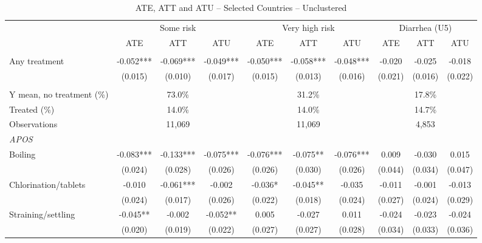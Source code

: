 \documentclass[10pt]{article}
\begin{document}
\clearpage
\begin{table}[H]
\centering
\caption{ATE, ATT and ATU -- Selected Countries -- Unclustered}
\label{tab:ate-att-atu-selected-countries-iid-aggregated}
\scriptsize
\setlength{\tabcolsep}{4pt}
\renewcommand{\arraystretch}{0.92}
\begin{adjustbox}{max width=\linewidth}
\begin{tabular}{lccccccccc}
\hline\hline
 & \multicolumn{3}{c}{Some risk} & \multicolumn{3}{c}{Very high risk} & \multicolumn{3}{c}{Diarrhea (U5)} \\
\cmidrule(lr){2-4}\cmidrule(lr){5-7}\cmidrule(lr){8-10}
 & ATE & ATT & ATU & ATE & ATT & ATU & ATE & ATT & ATU \\
\addlinespace[3pt]
\multicolumn{10}{l}{\textit{IRM}} \\
Any treatment & -0.052*** & -0.069*** & -0.049*** & -0.050*** & -0.058*** & -0.048*** & -0.020 & -0.025 & -0.018 \\
 & (0.015) & (0.010) & (0.017) & (0.015) & (0.013) & (0.016) & (0.021) & (0.016) & (0.022) \\
\addlinespace[6pt]
\multicolumn{10}{l}{\textit{Descriptive statistics and sample}} \\
Y mean, no treatment (\%) & \multicolumn{3}{c}{73.0\%} & \multicolumn{3}{c}{31.2\%} & \multicolumn{3}{c}{17.8\%} \\
Treated (\%) & \multicolumn{3}{c}{14.0\%} & \multicolumn{3}{c}{14.0\%} & \multicolumn{3}{c}{14.7\%} \\
Observations & \multicolumn{3}{c}{11,069} & \multicolumn{3}{c}{11,069} & \multicolumn{3}{c}{4,853} \\
\midrule
\multicolumn{10}{l}{\textit{APOS}} \\
Boiling & -0.083*** & -0.133*** & -0.075*** & -0.076*** & -0.075** & -0.076*** & 0.009 & -0.030 & 0.015 \\
 & (0.024) & (0.028) & (0.026) & (0.026) & (0.030) & (0.026) & (0.044) & (0.034) & (0.047) \\
Chlorination/tablets & -0.010 & -0.061*** & -0.002 & -0.036* & -0.045** & -0.035 & -0.011 & -0.001 & -0.013 \\
 & (0.024) & (0.017) & (0.026) & (0.022) & (0.018) & (0.024) & (0.027) & (0.024) & (0.029) \\
Straining/settling & -0.045** & -0.002 & -0.052** & 0.005 & -0.027 & 0.011 & -0.024 & -0.023 & -0.024 \\
 & (0.020) & (0.019) & (0.022) & (0.027) & (0.027) & (0.028) & (0.034) & (0.033) & (0.036) \\

\end{tabular}
\end{adjustbox}
\end{table}
\end{document}
